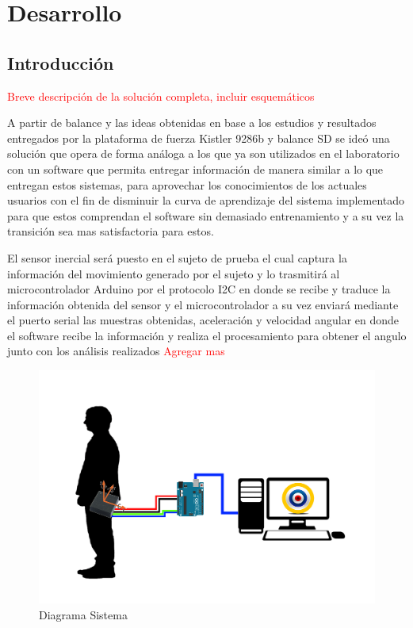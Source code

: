 \documentclass[12pt,a4paper]{article}
\let\stdsection\section
\renewcommand\section{\newpage\stdsection}
\begin{document}
\section{Desarrollo}
\subsection{Introducción}
\textcolor{red}{ Breve descripción de la solución completa, incluir esquemáticos}

A partir de balance y las ideas obtenidas en base a los estudios y resultados entregados por la plataforma de fuerza Kistler 9286b y balance SD se ideó una solución que opera de forma análoga a los que ya son utilizados en el laboratorio con un software que permita entregar información de manera similar a lo que entregan estos sistemas, para aprovechar los conocimientos de los actuales usuarios con el fin de disminuir la curva de aprendizaje del sistema implementado para que estos comprendan el software sin demasiado entrenamiento y a su vez la transición sea mas satisfactoria para estos.

El sensor inercial será puesto en el sujeto de prueba el cual captura la información del movimiento generado por el sujeto y lo trasmitirá al microcontrolador Arduino por el protocolo I2C en donde se recibe y traduce la información obtenida del sensor y el microcontrolador a su vez enviará mediante el puerto serial las muestras obtenidas, aceleración y velocidad angular en donde el software recibe la información y realiza el procesamiento para obtener el angulo junto con los análisis realizados \textcolor{red}{Agregar mas }

\begin{figure}[H]
\centering
\includegraphics[scale=0.2]{images/diagrama_sistema}
\caption{Diagrama Sistema}
\label{fig:diagramasistema}
\end{figure}
\end{document}
